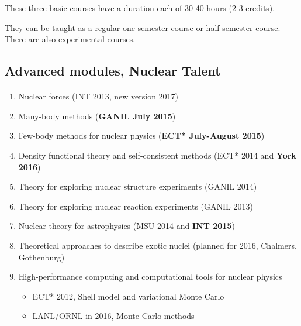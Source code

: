 \documentclass[%
twoside,                 %
final,                   %
10pt]{article}
\begin{document}
\noindent
These three basic courses have a duration each  of 30-40 hours (2-3 credits).   

They can be taught as a regular one-semester course or half-semester course. There are also experimental courses.








\subsection*{Advanced  modules, Nuclear Talent}

\paragraph{}
\begin{enumerate}
\item Nuclear forces (INT 2013, new version 2017)

\item Many-body methods (\textbf{GANIL July 2015})

\item Few-body methods for nuclear physics (\textbf{ECT* July-August 2015})

\item Density functional theory and self-consistent methods (ECT* 2014 and \textbf{York 2016})

\item Theory for exploring nuclear structure experiments (GANIL 2014)

\item Theory for exploring nuclear reaction experiments (GANIL 2013)

\item Nuclear theory for astrophysics (MSU 2014 and \textbf{INT 2015})

\item Theoretical approaches to describe  exotic nuclei (planned for 2016, Chalmers, Gothenburg)

\item High-performance computing and computational tools for nuclear physics
\begin{itemize}

  \item ECT* 2012, Shell model and variational Monte Carlo

  \item LANL/ORNL in 2016, Monte Carlo methods 
\end{itemize}

\noindent
\end{enumerate}
\end{document}
